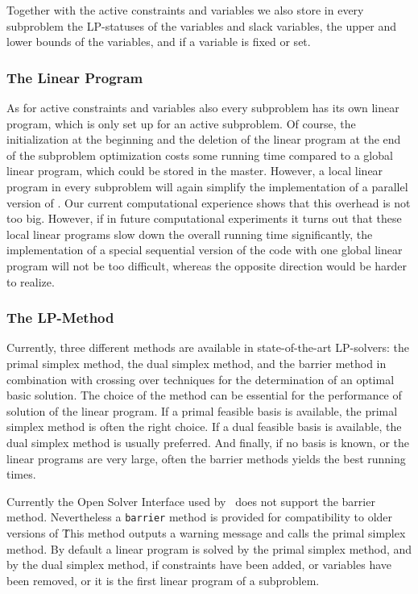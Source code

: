 Together with the active constraints and variables we also store
in every subproblem the LP-statuses of the variables and slack
variables, the upper and lower bounds of the variables, and if a variable
is fixed or set.

\subsubsection{The Linear Program}

As for active constraints and variables also every subproblem has its
own linear program, which is only set up for an active subproblem. 
Of course, the initialization at the beginning and the deletion of the
linear program at the end of the subproblem optimization costs some
running time compared to a global linear program, which could
be stored in the master. However, a local linear program in every
subproblem will again simplify the implementation of a parallel 
version of \ABACUS. Our current computational experience shows that
this overhead is not too big. However,
if in future computational experiments it turns out
that these local linear programs slow down the overall running time
significantly, the implementation of a special sequential version of the
code with one global linear program will not be too difficult, whereas
the opposite direction would be harder to realize.

\subsubsection{The LP-Method}
Currently, three different methods are available in state-of-the-art 
LP-solvers: the primal simplex method, the dual simplex method, and
the barrier method in combination with crossing over techniques
for the determination of an optimal basic solution. 
The choice of the method can be essential for the
performance of solution of the linear program. If a primal feasible basis is
available, the primal simplex method is often the right choice. If 
a dual feasible basis is available, the dual simplex method is usually
preferred. And finally, if no basis is known, or the linear programs
are very large, often the barrier methods yields the best running times.

Currently the Open Solver Interface used by \ABACUS\ does not support the 
barrier method. Nevertheless a {\tt barrier} method is provided for compatibility to 
older versions of \ABACUS\. This method outputs a warning message and calls the
primal simplex method.
By default a linear program is solved by the primal simplex method, and by
the dual simplex method, if constraints have been added, or variables have been
removed, or it is the first linear program of a subproblem.

